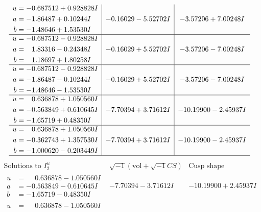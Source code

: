\documentclass[1p]{elsarticle_modified}
\theoremstyle{definition}
\newcommand{\I}{\sqrt{-1}}
\begin{document}
$$\begin{array}{c|c|c}
\begin{aligned}
u &= -0.687512 + 0.928828 I \\
a &= -1.86487 + 0.10244 I \\
b &= -1.48646 + 1.53530 I\end{aligned}
 & -0.16029 - 5.52702 I & -3.57206 + 7.00248 I \\ \hline\begin{aligned}
u &= -0.687512 - 0.928828 I \\
a &= \phantom{-}1.83316 - 0.24348 I \\
b &= \phantom{-}1.18697 + 1.80258 I\end{aligned}
 & -0.16029 + 5.52702 I & -3.57206 - 7.00248 I \\ \hline\begin{aligned}
u &= -0.687512 - 0.928828 I \\
a &= -1.86487 - 0.10244 I \\
b &= -1.48646 - 1.53530 I\end{aligned}
 & -0.16029 + 5.52702 I & -3.57206 - 7.00248 I \\ \hline\begin{aligned}
u &= \phantom{-}0.636878 + 1.050560 I \\
a &= -0.563849 + 0.610645 I \\
b &= -1.65719 + 0.48350 I\end{aligned}
 & -7.70394 + 3.71612 I & -10.19900 - 2.45937 I \\ \hline\begin{aligned}
u &= \phantom{-}0.636878 + 1.050560 I \\
a &= -0.362743 + 1.357530 I \\
b &= -1.000620 - 0.203449 I\end{aligned}
 & -7.70394 + 3.71612 I & -10.19900 - 2.45937 I\\
 \hline 
 \end{array}$$\newpage$$\begin{array}{c|c|c}  
\text{Solutions to }I^u_{2}& \I (\text{vol} + \sqrt{-1}CS) & \text{Cusp shape}\\
 \hline 
\begin{aligned}
u &= \phantom{-}0.636878 - 1.050560 I \\
a &= -0.563849 - 0.610645 I \\
b &= -1.65719 - 0.48350 I\end{aligned}
 & -7.70394 - 3.71612 I & -10.19900 + 2.45937 I \\ \hline\begin{aligned}
u &= \phantom{-}0.636878 - 1.050560 I \\

\end{aligned}
\end{array}$$
\end{document}

